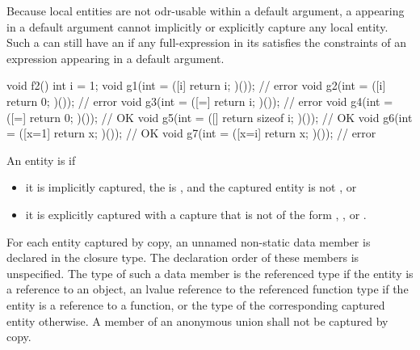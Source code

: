 \pnum
\begin{note}
Because local entities are not
odr-usable within a default argument,
a  appearing in a default argument
cannot implicitly or explicitly capture any local entity.
Such a 
can still have an  if
any full-expression in its 
satisfies the constraints of an expression appearing in
a default argument.
\end{note}
\begin{example}
\begin{codeblock}
void f2() {
  int i = 1;
  void g1(int = ([i]{ return i; })());          // error
  void g2(int = ([i]{ return 0; })());          // error
  void g3(int = ([=]{ return i; })());          // error
  void g4(int = ([=]{ return 0; })());          // OK
  void g5(int = ([]{ return sizeof i; })());    // OK
  void g6(int = ([x=1]{ return x; })());        // OK
  void g7(int = ([x=i]{ return x; })());        // error
}
\end{codeblock}
\end{example}

\pnum
An entity is  if
\begin{itemize}
\item
it is implicitly captured,
the  is \tcode{=}, and
the captured entity is not , or
\item
it is explicitly captured with a capture that is not of the form
,
\tcode{\&} , or
\tcode{\&}  .
\end{itemize}
For each entity captured by copy, an
unnamed non-static data member is declared in the closure type. The declaration order of
these members is unspecified. The type of such a data member is
the referenced type if the entity is a reference to an object,
an lvalue reference to the referenced function type if the entity is a reference to a function, or
the type of the corresponding captured entity otherwise.
A member of an anonymous union shall not be captured by copy.

